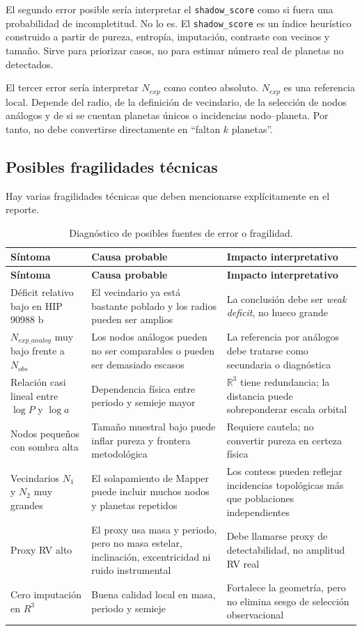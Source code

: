 \documentclass[11pt]{article}
\begin{document}
El segundo error posible sería interpretar el \texttt{shadow\_score} como si fuera una probabilidad de incompletitud. No lo es. El \texttt{shadow\_score} es un índice heurístico construido a partir de pureza, entropía, imputación, contraste con vecinos y tamaño. Sirve para priorizar casos, no para estimar número real de planetas no detectados.

El tercer error sería interpretar $N_{exp}$ como conteo absoluto. $N_{exp}$ es una referencia local. Depende del radio, de la definición de vecindario, de la selección de nodos análogos y de si se cuentan planetas únicos o incidencias nodo--planeta. Por tanto, no debe convertirse directamente en ``faltan $k$ planetas''.

\subsection{Posibles fragilidades técnicas}

Hay varias fragilidades técnicas que deben mencionarse explícitamente en el reporte.

\begin{longtable}{p{}p{}p{}}
\caption{Diagnóstico de posibles fuentes de error o fragilidad.}\label{tab:error-diagnosis}\\
\toprule
\textbf{Síntoma} & \textbf{Causa probable} & \textbf{Impacto interpretativo} \\
\midrule
\endfirsthead
\toprule
\textbf{Síntoma} & \textbf{Causa probable} & \textbf{Impacto interpretativo} \\
\midrule
\endhead
Déficit relativo bajo en HIP 90988 b & El vecindario ya está bastante poblado y los radios pueden ser amplios & La conclusión debe ser \emph{weak deficit}, no hueco grande \\
\addlinespace
$N_{exp\_analog}$ muy bajo frente a $N_{obs}$ & Los nodos análogos pueden no ser comparables o pueden ser demasiado escasos & La referencia por análogos debe tratarse como secundaria o diagnóstica \\
\addlinespace
Relación casi lineal entre $\log P$ y $\log a$ & Dependencia física entre periodo y semieje mayor & $\mathbb{R}^3$ tiene redundancia; la distancia puede sobreponderar escala orbital \\
\addlinespace
Nodos pequeños con sombra alta & Tamaño muestral bajo puede inflar pureza y frontera metodológica & Requiere cautela; no convertir pureza en certeza física \\
\addlinespace
Vecindarios $N_1$ y $N_2$ muy grandes & El solapamiento de Mapper puede incluir muchos nodos y planetas repetidos & Los conteos pueden reflejar incidencias topológicas más que poblaciones independientes \\
\addlinespace
Proxy RV alto & El proxy usa masa y periodo, pero no masa estelar, inclinación, excentricidad ni ruido instrumental & Debe llamarse proxy de detectabilidad, no amplitud RV real \\
\addlinespace
Cero imputación en $R^3$ & Buena calidad local en masa, periodo y semieje & Fortalece la geometría, pero no elimina sesgo de selección observacional \\
\bottomrule
\end{longtable}
\end{document}
